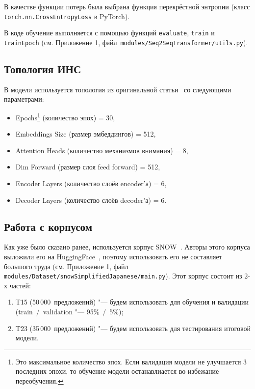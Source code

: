 В качестве функции потерь была выбрана функция перекрёстной энтропии (класс \texttt{torch.nn.CrossEntropyLoss} в PyTorch).

В коде обучение выполняется с помощью функций \texttt{evaluate}, \texttt{train} и \texttt{trainEpoch} (см. Приложение 1, файл~\texttt{modules/Seq2SeqTransformer/utils.py}).


\subsection{Топология ИНС}


В модели используется топология из оригинальной статьи~\cite{vaswani2017attention} со следующими параметрами:
\begin{itemize}%
  \item Epochs\footnote{Это максимальное количество эпох. Если валидация модели не улучшается 3 последних эпохи, то обучение модели останавлиается во избежание переобучения.} (количество эпох) = 30,
  \item Embeddings Size (размер эмбеддингов) = 512,
  \item Attention Heads (количество механизмов внимания) = 8,
  \item Dim Forward (размер слоя feed forward) = 512,
  \item Encoder Layers (количество слоёв encoder'а) = 6,
  \item Decoder Layers (количество слоёв decoder'а) = 6.
\end{itemize}


\subsection{Работа с корпусом}


Как уже было сказано ранее, используется корпус SNOW~\cite{snow-dataset}.
Авторы этого корпуса выложили его на HuggingFace~\cite{HuggingFace}, поэтому использовать его не составляет большого труда (см. Приложение 1, файл \texttt{modules/Dataset/snowSimplifiedJapanese/main.py}).
Этот корпус состоит из 2-х частей:
\begin{enumerate}[1.]%
  \item T15 (50\,000~предложений) "--- будем использовать для обучения и валидации (train~/~validation "--- 95\%~/~5\%);
  \item T23 (35\,000~предложений) "--- будем использовать для тестирования итоговой модели.
\end{enumerate}


